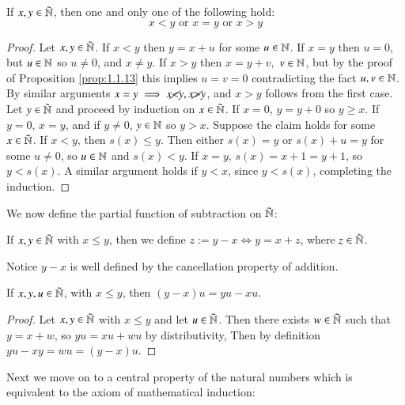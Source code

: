 \begin{prop}[Trichotomy]\label{prop:1.1.14}
    If $x,y \in \tilde{\mathbb N}$, then one and only one of the following hold: $$x < y \text{ or } x = y \text{ or } x > y$$
\end{prop}
\begin{proof}
    Let $x,y \in \tilde{\mathbb N}$. If $x < y$ then $y = x+u$ for some $u \in \mathbb N$. If $x =y$ then $u = 0$, but $u \in \mathbb N$ so $u \neq 0$, and $x \neq y$. If $x > y$ then $x = y+v,$ $v \in \mathbb N$, but by the proof of Proposition \ref{prop:1.1.13} this implies $u=v=0$ contradicting the fact $u,v \in \mathbb N$. By similar arguments $x =y \implies x \cancel{<} y, x \cancel{>} y$, and $x > y$ follows from the first case. Let $y \in \tilde{\mathbb N}$ and proceed by induction on $x \in \tilde{\mathbb N}$. If $x = 0$, $y = y+0$ so $y \geq x$. If $y = 0$, $x = y$, and if $y \neq 0$, $y \in \mathbb N$ so $y > x$. Suppose the claim holds for some $x \in \tilde{\mathbb N}$. If $x < y$, then $s(x) \leq y$. Then either $s(x) = y$ or $s(x) + u = y$ for some $u \neq 0$, so $u \in \mathbb N$ and $s(x) < y$. If $x = y$, $s(x) = x+1 = y+1$, so $y < s(x)$. A similar argument holds if $y < x$, since $y < s(x)$, completing the induction.
\end{proof}

We now define the partial function of subtraction on $\tilde{\mathbb N}$:

\begin{defn}
    If $x,y \in \tilde{\mathbb N}$ with $x \leq y$, then we define $z := y-x \iff y = x+z$, where $z \in \tilde{\mathbb N}$.
\end{defn}
Notice $y-x$ is well defined by the cancellation property of addition.

\begin{prop}\label{prop:1.1.17}
    If $x,y,u \in \tilde{\mathbb N}$, with $x \leq y$, then $(y-x)u = yu-xu$.
\end{prop}
\begin{proof}
    Let $x,y \in \tilde{\mathbb N}$ with $x \leq y$ and let $u \in \tilde{\mathbb N}$. Then there exists $w \in \tilde{\mathbb N}$ such that $y = x+w$, so $yu = xu+wu$ by distributivity, Then by definition $yu - xy = wu = (y-x)u$.
\end{proof}

Next we move on to a central property of the natural numbers which is equivalent to the axiom of mathematical induction:

